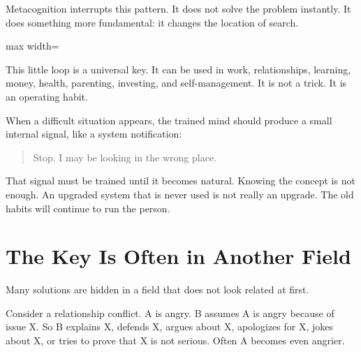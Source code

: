 Metacognition interrupts this pattern. It does not solve the problem instantly. It does something more fundamental: it changes the location of search.

\begin{center}
\begin{adjustbox}{max width=\linewidth}
\end{adjustbox}
\end{center}

This little loop is a universal key. It can be used in work, relationships, learning, money, health, parenting, investing, and self-management. It is not a trick. It is an operating habit.

When a difficult situation appears, the trained mind should produce a small internal signal, like a system notification:

\begin{quote}
Stop. I may be looking in the wrong place.
\end{quote}

That signal must be trained until it becomes natural. Knowing the concept is not enough. An upgraded system that is never used is not really an upgrade. The old habits will continue to run the person.

\section*{The Key Is Often in Another Field}

Many solutions are hidden in a field that does not look related at first.

Consider a relationship conflict. A is angry. B assumes A is angry because of issue X. So B explains X, defends X, argues about X, apologizes for X, jokes about X, or tries to prove that X is not serious. Often A becomes even angrier.

